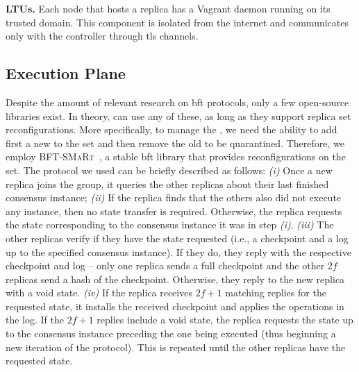 
 \textbf{LTUs.} Each node that hosts a replica has a Vagrant daemon running on its trusted domain.
This component is isolated from the internet and communicates only with the \system controller through \gls{tls} channels.

\subsection{Execution Plane}
\label{sec:executionplane}

Despite the amount of relevant research on \gls{bft} protocols, only a few open-source libraries exist.
In theory, \system can use any of these, as long as they support replica set reconfigurations.
More specifically, to manage the \replicas, we need the ability to add first a new \replica to the set and then remove the old \replica to be quarantined. 
Therefore, we employ \textsc{BFT-SMaRt}~\cite{Bessani:2014}, a stable \gls{bft} library that provides reconfigurations on the \replicas set.
The protocol we used can be briefly described as follows:
\emph{(i)} Once a new replica joins the group, it queries the other replicas about their last finished consensus instance;
\emph{(ii)} If the replica finds that the others also did not execute any instance, then no state transfer is required. 
Otherwise, the replica requests the state corresponding to the consensus instance it was in step \emph{(i)}.
\emph{(iii)} The other replicas verify if they have the state requested (i.e., a checkpoint and a log up to the specified consensus instance). 
If they do, they reply with the respective checkpoint and log -- only one replica sends a full checkpoint and the other $2f$ replicas send a hash of the checkpoint. 
Otherwise, they reply to the new replica with a void state.
\emph{(iv)} If the replica receives $2f+1$ matching replies for the requested state, it installs the received checkpoint and applies the operations in the log. 
If the $2f+1$ replies include a void state, the replica requests the state up to the consensus instance preceding the one being executed (thus beginning a new iteration of the protocol). 
This is repeated until the other replicas have the requested state. 



